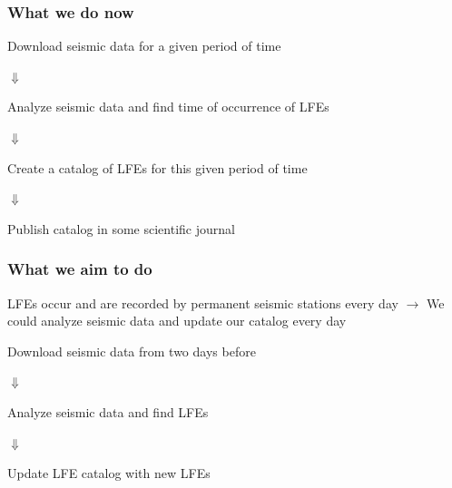 \documentclass{beamer}
\begin{document}
	\begin{frame}
		\frametitle{What we do now}
		\begin{exampleblock}{}
		\centering
		\normalsize{
		Download seismic data for a given period of time
		}
		\end{exampleblock}

		\centering
		\Huge{
		$\Downarrow$
		}

		\begin{exampleblock}{}
		\centering
		\normalsize{
		Analyze seismic data and find time of occurrence of LFEs
		}
		\end{exampleblock}

		\centering
		\Huge{
		$\Downarrow$
		}

		\begin{exampleblock}{}
		\centering
		\normalsize{
		Create a catalog of LFEs for this given period of time	
		}
		\end{exampleblock}

		\centering
		\Huge{
		$\Downarrow$
		}

		\begin{exampleblock}{}
		\centering
		\normalsize{
		Publish catalog in some scientific journal
		}	
		\end{exampleblock}
	\end{frame}

	\begin{frame}
		\frametitle{What we aim to do}
		LFEs occur and are recorded by permanent seismic stations every day $\rightarrow$ We could analyze seismic data and update our catalog every day

		\vspace{5mm}

		\begin{exampleblock}{}
		\centering
		\normalsize{
		Download seismic data from two days before
		}
		\end{exampleblock}

		\centering
		\Huge{
		$\Downarrow$
		}

		\begin{exampleblock}{}
		\centering
		\normalsize{
		Analyze seismic data and find LFEs
		}
		\end{exampleblock}

		\centering
		\Huge{
		$\Downarrow$
		}

		\begin{exampleblock}{}
		\centering
		\normalsize{
		Update LFE catalog with new LFEs
		}
		\end{exampleblock}
	\end{frame}
\end{document}
